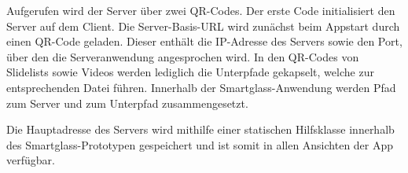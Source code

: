 Aufgerufen wird der Server über zwei QR-Codes. Der erste Code initialisiert den Server auf dem Client. Die Server-Basis-URL wird zunächst beim Appstart durch einen QR-Code geladen. Dieser enthält die IP-Adresse des Servers sowie den Port, über den die Serveranwendung angesprochen wird. In den QR-Codes von Slidelists sowie Videos werden lediglich die Unterpfade gekapselt, welche zur entsprechenden Datei führen. Innerhalb der Smartglass-Anwendung werden Pfad zum Server und zum Unterpfad zusammengesetzt.

Die Hauptadresse des Servers wird mithilfe einer statischen Hilfsklasse innerhalb des Smartglass-Prototypen gespeichert und ist somit in allen Ansichten der App verfügbar.